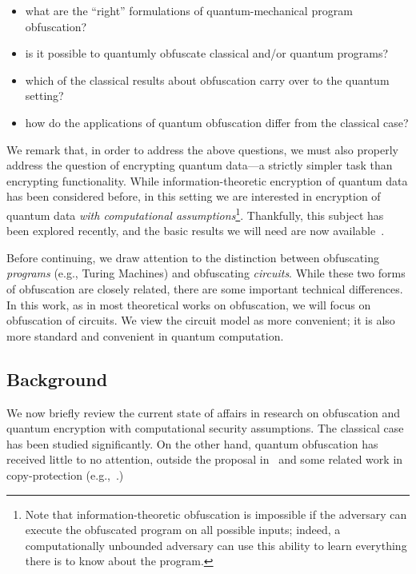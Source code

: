 \documentclass[envcountsame]{llncs}
\numberwithin{equation}{section}
\begin{document}
\begin{itemize}
\item what are the ``right'' formulations of quantum-mechanical program obfuscation?
\item is it possible to quantumly obfuscate classical and/or quantum programs?
\item which of the classical results about obfuscation carry over to the quantum setting?
\item how do the applications of quantum obfuscation differ from the classical case?
\end{itemize}

We remark that, in order to address the above questions, we must also properly address the question of encrypting quantum data---a strictly simpler task than encrypting functionality. While information-theoretic encryption of quantum data has been considered before, in this setting we are interested in encryption of quantum data \emph{with computational assumptions}\footnote{Note that information-theoretic obfuscation is impossible if the adversary can execute the obfuscated program on all possible inputs; indeed, a computationally unbounded adversary can use this ability to learn everything there is to know about the program.}. Thankfully, this subject has been explored recently, and the basic results we will need are now available~\cite{BJ15, ABFGSS16}.

Before continuing, we draw attention to the distinction between obfuscating \emph{programs} (e.g., Turing Machines) and obfuscating \emph{circuits}. While these two forms of obfuscation are closely related, there are some important technical differences. In this work, as in most theoretical works on obfuscation, we will focus on obfuscation of circuits. We view the circuit model as more convenient; it is also more standard and convenient in quantum computation.

\subsection{Background}

We now briefly review the current state of affairs in research on obfuscation and quantum encryption with computational security assumptions. The classical case has been studied significantly. On the other hand, quantum obfuscation has received little to no attention, outside the proposal in~\cite{AJJ14} and some related work in copy-protection (e.g.,~\cite{Aar09}.) %
\end{document}
